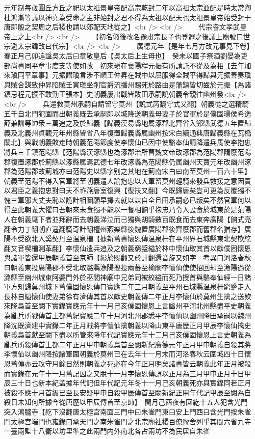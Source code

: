 元年制每歲圓丘方丘之祀以太祖景皇帝配高宗乾封二年以高祖太宗並配是時太常卿杜鴻漸等議以神堯為受命之主非始封之君不得為太祖以配天也太祖景皇帝始受封于唐即殷之契周之后稷也請以郊配天地從之】<br />
<br />
　　代宗睿文孝武皇帝上之上<br />
<br />
　　【初名俶後改名豫肅宗長子也登遐之後議上廟號曰世宗避太宗諱改曰代宗】<br />
<br />
　　廣德元年【是年七月方改元事見下卷】春正月己卯追諡吳太后曰章敬皇后【吳太后上生母也】　癸未以國子祭酒劉晏為吏部尚書同平章事度支等使如故　初來瑱在襄陽程元振有所請託不從及為相【去年加來瑱同平章事】元振譛瑱言涉不順王仲昇在賊中以屈服得全賊平得歸與元振善奏瑱與賊合謀致仲昇陷賊壬寅瑱坐削官爵流播州賜死於路由是藩鎮皆切齒於元振【為諸鎮忌程元振不敢勤王張本】史朝義屢出戰皆敗田承嗣說朝義令親往幽州發<br />
<br />
　　兵還救莫州承嗣自請留守莫州【說式芮翻守式又翻】朝義從之選精騎五千自北門犯圍而出朝義既去承嗣即以城降送朝義母妻子於官軍於是僕固瑒侯希逸薛兼訓等帥衆三萬追之及於歸義【歸義漢易縣地属涿郡北齊省入鄭縣武德五年置歸義及北義州貞觀元年州縣皆省八年復置歸義縣属幽州按宋白續通典唐歸義縣在瓦橋關北】與戰朝義敗走時朝義范陽節度使李懷仙已因中使駱奉仙請降遣兵馬使李抱忠將兵三千鎮范陽縣【范陽縣漢涿縣也為涿郡治所曹魏文帝改涿郡為范陽郡隋廢范陽郡復置涿郡於薊縣以涿縣属焉武德七年改涿縣為范陽縣仍属幽州天寶元年改幽州涿郡為范陽郡故薊城亦曰范陽史以縣字别之其地在薊南宋白曰南至莫州一百六十里】朝義至范陽不得入官軍將至朝義遣人諭抱忠以大軍留莫州輕騎來發兵救援之意因責以君臣之義抱忠對曰天不祚燕唐室復興【復扶又翻】今既歸唐矣豈可更為反覆獨不愧三軍邪大丈夫恥以詭計相圖願早擇去就以謀自全且田承嗣必已叛矣不然官軍何以得至此朝義大懼曰吾朝來未食獨不能以一餐相餉乎抱忠乃令人設食於城東於是范陽人在朝義麾下者並拜辭而去朝義涕泣而已獨與胡騎數百既食而去東奔廣陽【餉式亮翻令力丁翻朝直遥翻騎奇計翻檀州燕樂縣後魏置廣陽郡後齊廢郡而舊郡名猶存】廣陽不受欲北入奚契丹至温泉柵【據新舊書懷恩傳温泉柵在平州界石城縣東北契欺紇翻又音喫柵測革翻】李懷仙遣兵追及之朝義窮蹙縊於林中懷仙取其首以獻僕固懷恩與諸軍皆還甲辰朝義首至京師【縊於賜翻又於計翻還音旋又如字　考異曰河洛春秋曰朝義東投廣陽郡不受北取潞縣漁陽擬投兩蕃至榆關李懷仙使使招回却至漁陽過從潞縣至幽州城東阿婆門外於巫閭神廟中兄弟同被絞縊而死乃授首與駱奉仙經一日諸軍方知歸莫州城下舊僕固懷恩傳曰寶應二年三月朝義至平州石城縣温泉柵窮蹙走入長林自縊懷仙使妻弟徐有濟傳其首以獻史朝義傳二年正月李懷仙於莫州生擒之送欵來降梟首至闕下實錄寶應元年十一月己亥僕固懷恩上言幽州平河北州縣盡平史朝義為亂兵所戮傳首上都舊紀寶應二年十月河北州郡悉平李懷仙以幽州降田承嗣以魏州降沈既濟建中實錄二年正月賊將李懷仙擒朝義以降山東平唐歷正月甲辰李懷仙擒史朝義梟首獻至闕下盡以所管來降年代記寶應元年十二月己亥僕固懷恩上言史朝義為亂兵所殺傳首上都二年正月甲申朝義梟首至闕新紀廣德元年正月甲申朝義自殺其將李懷仙以幽州降按諸軍圍朝義於莫州已在去年十一月末而河洛春秋云圍城四十日懷恩舊傳亦云攻守月餘日然則朝義之死必在今年正月明矣諸書皆云朝義此年正月被殺而實錄在元年十一月舊記因之又脫十一月字懷恩傳誤以正月為三月甲申正月十日甲辰三十日也新本紀盖據年代記但年代記元年冬十一月己亥朝義死亦與實錄同若正月被殺不應十月首級已至長安疑甲申自殺甲辰傳首至闕新紀正用年代記甲辰至闕為自殺日未知何所據今從唐歷以甲辰傳首至京師】　閏月己酉夜有回紇十五人犯含光門突入鴻臚寺【紇下沒翻唐太極宫南面三門中曰朱雀門東曰安上門西曰含光門按朱雀門太極宫端門也雍錄曰承天門之南朱雀門之北宗廟社稷百僚廨舍列乎其間六省九寺一臺兩監十八衛以坊里準之此兩門内外南北各占兩坊不為民居自朱雀